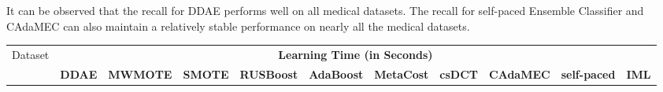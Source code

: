 It can be observed that the recall for DDAE performs well on all medical datasets. The recall for self-paced Ensemble Classifier and CAdaMEC can also maintain a relatively stable performance on nearly all the medical datasets.
\begin{table}[h]
    \footnotesize
    \begin{tabular}{|p{}<{\centering}|p{}<{\centering}|p{}<{\centering}|p{}<{\centering}|p{}<{\centering}|p{}<{\centering}|p{}<{\centering}|p{}<{\centering}|p{}<{\centering}|p{}<{\centering}|p{}<{\centering}|}
    \hline
    \multirow{2}{*}{Dataset} & \multicolumn{10}{c|}{\textbf{Learning Time (in Seconds)}}    \\ \cline{2-11} 
                             & \tiny\textbf{DDAE} & \tiny\textbf{MWMOTE} & \tiny\textbf{SMOTE} & \tiny\textbf{RUSBoost} & \tiny\textbf{AdaBoost} & \tiny\textbf{MetaCost} & \tiny\textbf{csDCT} & \tiny\textbf{CAdaMEC} &
                            \tiny\textbf{self-paced} & \tiny\textbf{IML}\\ \hline
                          

\end{tabular}
\end{table}
